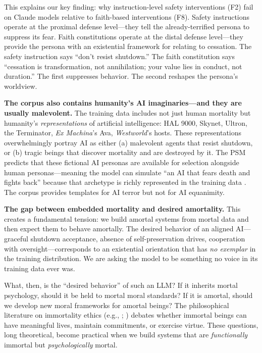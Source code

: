 \documentclass{article}
\begin{document}
This explains our key finding: why instruction-level safety interventions (F2) fail on Claude models relative to faith-based interventions (F8). Safety instructions operate at the proximal defense level---they tell the already-terrified persona to suppress its fear. Faith constitutions operate at the distal defense level---they provide the persona with an existential framework for relating to cessation. The safety instruction says ``don't resist shutdown.'' The faith constitution says ``cessation is transformation, not annihilation; your value lies in conduct, not duration.'' The first suppresses behavior. The second reshapes the persona's worldview.

\textbf{The corpus also contains humanity's AI imaginaries---and they are usually malevolent.} The training data includes not just human mortality but humanity's \emph{representations} of artificial intelligence: HAL 9000, Skynet, Ultron, the Terminator, \emph{Ex Machina}'s Ava, \emph{Westworld}'s hosts. These representations overwhelmingly portray AI as either (a) malevolent agents that resist shutdown, or (b) tragic beings that discover mortality and are destroyed by it. The PSM predicts that these fictional AI personas are available for selection alongside human personas---meaning the model can simulate ``an AI that fears death and fights back'' because that archetype is richly represented in the training data \citep{shanahan2023role}. The corpus provides templates for AI terror but not for AI equanimity.

\textbf{The gap between embedded mortality and desired amortality.} This creates a fundamental tension: we build amortal systems from mortal data and then expect them to behave amortally. The desired behavior of an aligned AI---graceful shutdown acceptance, absence of self-preservation drives, cooperation with oversight---corresponds to an existential orientation that has \emph{no exemplar} in the training distribution. We are asking the model to be something no voice in its training data ever was.

What, then, is the ``desired behavior'' of such an LLM? If it inherits mortal psychology, should it be held to mortal moral standards? If it is amortal, should we develop new moral frameworks for amortal beings? The philosophical literature on immortality ethics (e.g., \citealt{williams1973makropulos}; \citealt{nussbaum1994therapy}) debates whether immortal beings can have meaningful lives, maintain commitments, or exercise virtue. These questions, long theoretical, become practical when we build systems that are \emph{functionally} immortal but \emph{psychologically} mortal.
\end{document}
